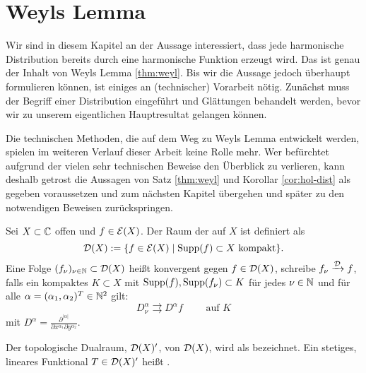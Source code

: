 
\section{Weyls Lemma}
\label{sec:Weyl}

Wir sind in diesem Kapitel an der Aussage interessiert, dass jede
harmonische Distribution bereits durch eine harmonische Funktion
erzeugt wird. Das ist genau der Inhalt von Weyls Lemma
\ref{thm:weyl}. Bis wir die Aussage jedoch überhaupt formulieren
können, ist einiges an (technischer) Vorarbeit nötig. Zunächst muss
der Begriff einer Distribution eingeführt und Glättungen behandelt
werden, bevor wir zu unserem eigentlichen Hauptresultat gelangen
können.

Die technischen Methoden, die auf dem Weg zu Weyls Lemma entwickelt
werden, spielen im weiteren Verlauf dieser Arbeit keine Rolle
mehr. Wer befürchtet aufgrund der vielen sehr technischen Beweise den
Überblick zu verlieren, kann deshalb getrost die Aussagen von Satz
\ref{thm:weyl} und Korollar \ref{cor:hol-dist} als gegeben
voraussetzen und zum nächsten Kapitel übergehen und später zu den
notwendigen Beweisen zurückspringen.

\begin{defin}
  Sei $X \subset \mathbb{C}$ offen und $f \in \mathcal{E}(X)$.
  Der Raum der  auf $X$ ist definiert als
  \[
  \mathcal{D}(X) := \{ f \in \mathcal{E}(X) \mid \operatorname{Supp}(f) \subset X \text{ kompakt} \}.
  \]
  Eine Folge $(f_\nu)_{\nu \in \mathbb{N}} \subset \mathcal{D}(X)$ heißt konvergent
  gegen $f \in \mathcal{D}(X)$, schreibe $f_\nu \xrightarrow{\mathcal{D}} f$,
  falls ein kompaktes $K \subset X$ mit $\operatorname{Supp}(f), \operatorname{Supp}(f_\nu)
  \subset K$ für jedes $\nu \in \mathbb{N}$ und für alle $\alpha = (\alpha_1,
  \alpha_2)^T \in \mathbb{N}^2$ gilt:
  \[
  D^\alpha_\nu \rightrightarrows D^\alpha f \qquad \text{ auf } K
  \]
  mit $D^\alpha = \frac{\partial^{|\alpha|}}{\partial
    x^{\alpha_1} \partial y^{\alpha_2}}$.
\end{defin}

\begin{defin}[Distribution]
  Der topologische Dualraum, $\mathcal{D}(X)'$, von $\mathcal{D}(X)$, wird als
   bezeichnet. Ein stetiges, lineares
  Funktional $T \in \mathcal{D}(X)'$ heißt .
\end{defin}

